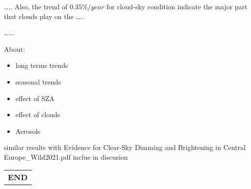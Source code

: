 \documentclass[preprint, 3p,
authoryear]{elsarticle} %
\begin{document}
\ldots.. Also, the trend of \(0.35\%/year\) for cloud-sky condition
indicate the major part that clouds play on the \ldots..

\ldots\ldots.

About:

\begin{itemize}
\item
  long terms trends
\item
  seasonal trends
\item
  effect of SZA
\item
  effect of clouds
\item
  Aerosols
\end{itemize}

similar results with Evidence for Clear‐Sky Dimming and Brightening in
Central Europe\_Wild2021.pdf inclue in discusion

\begin{longtable}[]{@{}c@{}}
\toprule\noalign{}
\endhead
\bottomrule\noalign{}
\endlastfoot
\textbf{END} \\
\end{longtable}


\end{document}
